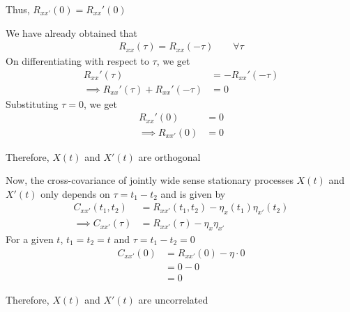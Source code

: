 \documentclass{beamer}
\begin{document}
	\begin{frame}
	Thus, $R_{xx'}(0) = R_{xx}'(0)$
	
	We have already obtained that
	\begin{align}
		R_{xx}(\tau) = R_{xx}(-\tau) \qquad \forall \tau
	\end{align}
	On differentiating with respect to $\tau$, we get
	\begin{align}
		R_{xx}'(\tau) &= -R_{xx}'(-\tau) \\
		\implies R_{xx}'(\tau) + R_{xx}'(-\tau) &= 0
	\end{align}
	Substituting $\tau = 0$, we get
	\begin{align}
		R_{xx}'(0) &= 0 \\
		\implies R_{xx'}(0) &= 0
	\end{align}
	
	\begin{alertblock}{Therefore,}
		$X(t)$ and $X'(t)$ are orthogonal
	\end{alertblock}
	\end{frame}

	\begin{frame}
	Now, the cross-covariance of jointly wide sense stationary processes $X(t)$ and $X'(t)$ only depends on $\tau = t_1-t_2$ and is given by
	\begin{align}
		C_{xx'}(t_1, t_2) &= R_{xx'}(t_1, t_2) - \eta_{x}(t_1) \eta_{x'}(t_2) \\
		\implies C_{xx'}(\tau) &= R_{xx'}(\tau) - \eta_{x} \eta_{x'}  
	\end{align}
	For a given $t$, $t_1 = t_2 = t$ and $\tau = t_1 - t_2 = 0$
	\begin{align}
		C_{xx'}(0) &= R_{xx'}(0) - \eta \cdot 0 \\
		&= 0 - 0 \\
		&= 0
	\end{align}
	
	\begin{alertblock}{Therefore,}
		$X(t)$ and $X'(t)$ are uncorrelated
	\end{alertblock}
	\end{frame}
	
\end{document}
